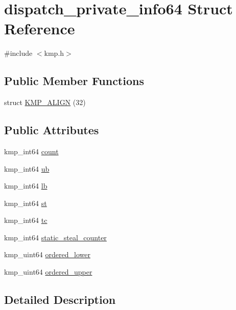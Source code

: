 \hypertarget{structdispatch__private__info64}{\section{dispatch\-\_\-private\-\_\-info64 Struct Reference}
\label{structdispatch__private__info64}
}


{\ttfamily \#include $<$kmp.\-h$>$}

\subsection*{Public Member Functions}
\begin{DoxyCompactItemize}
\item 
struct \hyperlink{structdispatch__private__info64_a126cc269fd75b3a581275603135cc138}{K\-M\-P\-\_\-\-A\-L\-I\-G\-N} (32)
\end{DoxyCompactItemize}
\subsection*{Public Attributes}
\begin{DoxyCompactItemize}
\item 
kmp\-\_\-int64 \hyperlink{structdispatch__private__info64_a04e33fbeab02a88ca8c644e533487665}{count}
\item 
kmp\-\_\-int64 \hyperlink{structdispatch__private__info64_a9395a2882f09adccf68ab36b7c797e82}{ub}
\item 
kmp\-\_\-int64 \hyperlink{structdispatch__private__info64_a07d1113d5e87589745d971fd53df7e54}{lb}
\item 
kmp\-\_\-int64 \hyperlink{structdispatch__private__info64_a6f3f169d5b0c93c223f58177e6beae2c}{st}
\item 
kmp\-\_\-int64 \hyperlink{structdispatch__private__info64_acf0cb827cb09138d969c157a89cd8f48}{tc}
\item 
kmp\-\_\-int64 \hyperlink{structdispatch__private__info64_aa9a2e92df78d7f5dab022179e5f940d6}{static\-\_\-steal\-\_\-counter}
\item 
kmp\-\_\-uint64 \hyperlink{structdispatch__private__info64_a7612d73d58d16d478854817bc4a7673f}{ordered\-\_\-lower}
\item 
kmp\-\_\-uint64 \hyperlink{structdispatch__private__info64_a65c09035eab7c34a886d023316f73ca6}{ordered\-\_\-upper}
\end{DoxyCompactItemize}


\subsection{Detailed Description}


